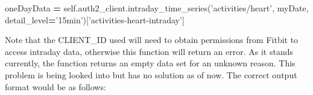 \documentclass[]{book}
\newenvironment{Shaded}{\begin{snugshade}}{\end{snugshade}}
\newcommand{\StringTok}[1]{\textcolor[rgb]{0.31,0.60,0.02}{#1}}
\newcommand{\VariableTok}[1]{\textcolor[rgb]{0.00,0.00,0.00}{#1}}
\newcommand{\OperatorTok}[1]{\textcolor[rgb]{0.81,0.36,0.00}{\textbf{#1}}}
\newcommand{\NormalTok}[1]{#1}
\begin{document}
\begin{Shaded}
\begin{Highlighting}[]
\NormalTok{oneDayData }\OperatorTok{=} \VariableTok{self}\NormalTok{.auth2_client.intraday_time_series(}\StringTok{'activities/heart'}\NormalTok{, myDate, detail_level}\OperatorTok{=}\StringTok{'15min'}\NormalTok{)[}\StringTok{'activities-heart-intraday'}\NormalTok{]}
\end{Highlighting}
\end{Shaded}

Note that the CLIENT\_ID used will need to obtain permissions from
Fitbit to access intraday data, otherwise this function will return an
error. As it stands currently, the function returns an empty data set
for an unknown reason. This problem is being looked into but has no
solution as of now. The correct output format would be as follows:
\end{document}

